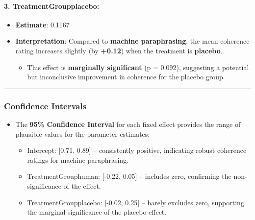 \documentclass[
]{article}
\providecommand{\tightlist}{%
  \setlength{\itemsep}{0pt}\setlength{\parskip}{0pt}}
\begin{document}
\paragraph{\texorpdfstring{\textbf{3.
TreatmentGroupplacebo:}}{3. TreatmentGroupplacebo:}}\label{treatmentgroupplacebo-4}

\begin{itemize}
\tightlist
\item
  \textbf{Estimate}: 0.1167
\item
  \textbf{Interpretation}: Compared to \textbf{machine paraphrasing},
  the mean coherence rating increases slightly (by \textbf{+0.12}) when
  the treatment is \textbf{placebo}.

  \begin{itemize}
  \tightlist
  \item
    This effect is \textbf{marginally significant} (p = 0.092),
    suggesting a potential but inconclusive improvement in coherence for
    the placebo group.
  \end{itemize}
\end{itemize}

\begin{center}\rule{0.5\linewidth}{0.5pt}\end{center}

\subsubsection{\texorpdfstring{\textbf{Confidence
Intervals}}{Confidence Intervals}}\label{confidence-intervals-4}

\begin{itemize}
\tightlist
\item
  The \textbf{95\% Confidence Interval} for each fixed effect provides
  the range of plausible values for the parameter estimates:

  \begin{itemize}
  \tightlist
  \item
    Intercept: {[}0.71, 0.89{]} -- consistently positive, indicating
    robust coherence ratings for machine paraphrasing.
  \item
    TreatmentGrouphuman: {[}-0.22, 0.05{]} -- includes zero, confirming
    the non-significance of the effect.
  \item
    TreatmentGroupplacebo: {[}-0.02, 0.25{]} -- barely excludes zero,
    supporting the marginal significance of the placebo effect.
  \end{itemize}
\end{itemize}
\end{document}
